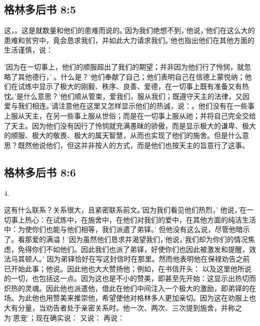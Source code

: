 
\subsection{格林多后书 8:5}

 这，。这是就数量和他们的患难而说的。'因为我们绝想不到，'他说，'他们在这么大的患难和贫穷中，竟会恳求我们，并如此大力请求我们。'他也指出他们在其他方面的生活谨慎，说：\par

\par

'因为在一切事上，他们的顺服超出了我们的期望；并非因为他们行了怜悯，就忽略了其他德行，' 。什么是？'他们奉献了自己；他们表明自己在信德上蒙悦纳；他们在试炼中显示了极大的刚毅、秩序、良善、爱德，在一切事上既有准备又有热忱。'是什么意思？'他们顺从管束，爱我们，服从我们；既遵守天主的法律，又因爱与我们相连。'请注意他在这里又怎样显示他们的热诚，说：。他们没有在一些事上服从天主，在另一些事上服从世俗；而是在一切事上服从祂；并将自己完全交给了天主。因为他们没有因行了怜悯就充满愚昧的骄傲，而是显示极大的谦卑、极大的顺服、极大的敬畏、极大的属天智慧，从而也实现了他们的施舍。但是什么意思？既然他说他们，但这并非按人的方式，而是他们也按天主的旨意行了这事。\par


\subsection{格林多后书 8:6}

4. \par

这有什么联系？关系很大，且紧密联系前文。'因为我们看见他们热烈，' 他说，'在一切事上热心：在试炼中，在施舍中，在他们对我们的爱中，在其他方面的纯洁生活中：为使你们也能与他们相等，我们派遣了弟铎。' 但他没有这么说，尽管他暗示了。看那爱的满溢！'因为虽然他们恳求并渴望我们，'他说，'我们却为你们的情况焦虑，免得你们不如他们。因此我们也派了弟铎，好使你们也因此被激发和提醒，效法马其顿人。' 因为弟铎恰好在写这封信时在那里。然而他表明他在保禄劝告之前已开始此事；他说。因此他也大大赞扬他；例如，在书信开头：  以及这里他所说的一切，也包括这一点。因为这也是不小的赞美，即甚至先开始：这显示出热切而炽热的灵魂。因此他也派遣他，借此在他们中间注入一个极大的激励，即弟铎的在场。为此他也用赞美来推崇他，希望使他对格林多人更加亲切。因为这在劝服上也大有分量，当劝告者处于亲密关系时。他一次、两次、三次提到施舍，并称之为'恩宠'；现在确实说： 又说： 再说：\par

